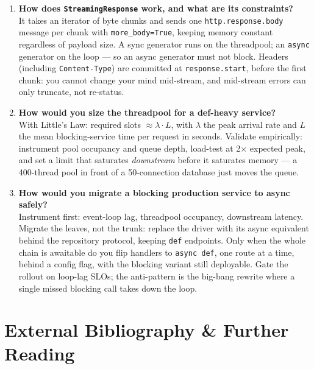 \begin{enumerate}[label=\textbf{Q\arabic*.}, leftmargin=1.3cm, itemsep=0.8em]
\item \textbf{How does \texttt{StreamingResponse} work, and what are its
constraints?}\\
It takes an iterator of byte chunks and sends one
\texttt{http.response.body} message per chunk with \texttt{more\_body=True},
keeping memory constant regardless of payload size. A sync generator runs on
the threadpool; an \texttt{async} generator on the loop --- so an async
generator must not block. Headers (including \texttt{Content-Type}) are
committed at \texttt{response.start}, before the first chunk: you cannot
change your mind mid-stream, and mid-stream errors can only truncate, not
re-status.

\item \textbf{How would you size the threadpool for a def-heavy service?}\\
With Little's Law: required slots $\approx \lambda \cdot L$, with $\lambda$
the peak arrival rate and $L$ the mean blocking-service time per request in
seconds. Validate empirically: instrument pool occupancy and queue depth,
load-test at 2$\times$ expected peak, and set a limit that saturates
\emph{downstream} before it saturates memory --- a 400-thread pool in front
of a 50-connection database just moves the queue.

\item \textbf{How would you migrate a blocking production service to async
safely?}\\
Instrument first: event-loop lag, threadpool occupancy, downstream latency.
Migrate the leaves, not the trunk: replace the driver with its async
equivalent behind the repository protocol, keeping \texttt{def} endpoints.
Only when the whole chain is awaitable do you flip handlers to
\texttt{async def}, one route at a time, behind a config flag, with the
blocking variant still deployable. Gate the rollout on loop-lag SLOs; the
anti-pattern is the big-bang rewrite where a single missed blocking call
takes down the loop.

\end{enumerate}

\section{External Bibliography \& Further Reading}
\label{sec:ch6-bibliography}

